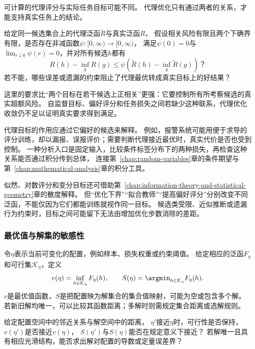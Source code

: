 可计算的代理评分与实际任务目标可能不同。
代理优化只有通过两者的关系，才能支持真实任务上的结论。

\begin{mathproblem}[代理泛函能否支持真实目标]
  \label{question:future-proxy-risk}
  给定同一候选集合上的代理泛函$\widetilde R$与真实泛函$R$，
  假设相关风险有限且两个下确界有限，是否存在非减函数$\psi:[0,\infty)\to[0,\infty)$，
  满足$\psi(0)=0$与$\lim_{r\downarrow0}\psi(r)=0$，并对所有候选$h$都有
  \[
    R(h)-\inf_gR(g)
    \leq\psi\!\left(\widetilde R(h)-\inf_g\widetilde R(g)\right)\text{？}
  \]
  若不能，哪些误差或遗漏的约束阻止了代理最优转成真实目标上的好结果？
\end{mathproblem}

这里的要求比“两个目标在若干候选上正相关”更强：它要控制所有所考察候选的真实超额风险。
自监督目标、偏好评分和任务损失之间若缺少这种联系，代理优化收敛仍不足以证明真实要求得到满足。

代理目标的作用应通过它偏好的候选来解释。
例如，报警系统可能用便于求导的评分训练，却以漏报、误报评价；需要判断代理接近最优时，真实代价是否也受到控制。
一种分析入口是固定输入，比较条件标签分布下的两种损失，再检查这种关系能否通过积分传到总体，
连接第~\ref{chap:random-variables}章的条件期望与第~\ref{chap:mathematical-analysis}章的积分工具。

似然、对数评分和变分目标还可借助第~\ref{chap:information-theory-and-statistical-geometry}章的散度解释。
但“优化下界”“拟合教师”“提高偏好评分”分别改变不同泛函，不能仅因为它们都能训练就视作同一目标。
候选类受限、近似推断或遗漏行为约束时，目标之间可能留下无法由增加优化步数消除的差距。

\subsubsection{最优值与解集的敏感性}
\label{sec:future-analysis-solution-sensitivity}

令$\eta$表示当前可变化的配置，例如样本、损失权重或约束阈值。
给定相应的泛函$F_\eta$和可行集$\mathcal K_\eta$，定义
\[
  v(\eta)=\inf_{h\in\mathcal K_\eta}F_\eta(h),\qquad
  S(\eta)=\argmin_{h\in\mathcal K_\eta}F_\eta(h).
\]
$v$是最优值函数，$S$是把配置映为解集合的集合值映射，可能为空或包含多个解。
若新旧解均唯一，可以比较其函数距离；多解时则需规定集合距离或选解规则。

\begin{mathproblem}[最优值与解集对配置的敏感性]
  \label{question:future-solution-sensitivity}
  给定配置空间中的邻近关系与解空间中的距离，
  $\eta'$接近$\eta$时，可行性是否保持，$v(\eta')$是否接近$v(\eta)$，
  $S(\eta')$与$S(\eta)$能否在规定意义下接近？
  若解唯一且具有相应光滑结构，能否求出解对配置的导数或定量误差界？
\end{mathproblem}

